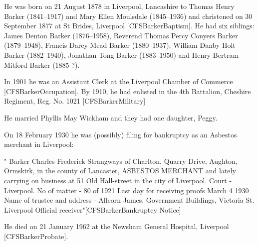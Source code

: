 

He was born on 21 August 1878 in	Liverpool, Lancashire to Thomas Henry Barker (1841--1917) and Mary Ellen Moulsdale (1845--1936) and christened on 30 September 1877 at St Brides, Liverpool [CFSBarkerBaptism]. He had six siblings:  James Denton Barker (1876--1958), Reverend Thomas Percy Conyers Barker (1879--1948), Francis Darcy Mead Barker (1880--1937), William Danby Holt Barker (1882--1940), Jonathan Tong Barker (1883--1950) and Henry Bertram Mitford Barker (1885-?). 


In 1901 he was an Assistant Clerk at the Liverpool  Chamber of Commerce [CFSBarkerOccupation].  By 1910, he had enlisted in the  4th Battalion, Cheshire Regiment, Reg. No. 1021 [CFSBarkerMilitary]

He married Phyllis May Wickham and they had one daughter, Peggy.


On 18 February 1930 he was (possibly) filing for bankruptcy as an Asbestos merchant in Liverpool:

" Barker Charles Frederick Strangways of Charlton, Quarry Drive, Aughton, Ormskirk, in the county of Lancaster, ASBESTOS MERCHANT and lately carrying on business at 51 Old Hall-street in the city of Liverpool.
Court - Liverpool.
No of matter - 80 of 1921
Last day for receiving proofs March 4 1930
Name of trustee and address - Allcorn James, Government Buildings, Victoria St. Liverpool Official receiver"[CFSBarkerBankruptcy Notice]


He died on 21 January 1962 at the Newsham General Hospital, Liverpool [CFSBarkerProbate].
